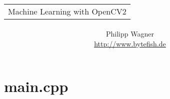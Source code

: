 \documentclass[10pt]{article}
\title{\begin{tabular}{p{11cm}}\centering
Machine Learning with OpenCV2
\end{tabular}}
\author{Philipp Wagner\\\href{http://www.bytefish.de}{http://www.bytefish.de}}
\begin{document}
\maketitle
\tableofcontents








\appendix

\section{main.cpp}




\end{document}
